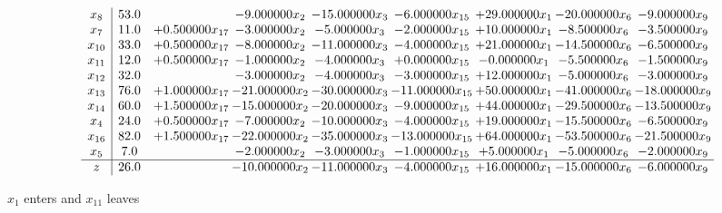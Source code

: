 \documentclass[10pt]{article}
\begin{document}
 \[\begin{array}{c| c c@{\hskip 2pt} c@{\hskip 2pt} c@{\hskip 2pt} c@{\hskip 2pt} c@{\hskip 2pt} c@{\hskip 2pt} c@{\hskip 2pt} }
 x_{8}   &  53.0  &   & -9.000000 x_{2} & -15.000000 x_{3} & -6.000000 x_{15} & + 29.000000 x_{1} & -20.000000 x_{6} & -9.000000 x_{9}\\
 x_{7}   &  11.0 & + 0.500000 x_{17} & -3.000000 x_{2} & -5.000000 x_{3} & -2.000000 x_{15} & + 10.000000 x_{1} & -8.500000 x_{6} & -3.500000 x_{9}\\
 x_{10}   &  33.0 & + 0.500000 x_{17} & -8.000000 x_{2} & -11.000000 x_{3} & -4.000000 x_{15} & + 21.000000 x_{1} & -14.500000 x_{6} & -6.500000 x_{9}\\
 x_{11}   &  12.0 & + 0.500000 x_{17} & -1.000000 x_{2} & -4.000000 x_{3} & + 0.000000 x_{15} & -0.000000 x_{1} & -5.500000 x_{6} & -1.500000 x_{9}\\
 x_{12}   &  32.0  &   & -3.000000 x_{2} & -4.000000 x_{3} & -3.000000 x_{15} & + 12.000000 x_{1} & -5.000000 x_{6} & -3.000000 x_{9}\\
 x_{13}   &  76.0 & + 1.000000 x_{17} & -21.000000 x_{2} & -30.000000 x_{3} & -11.000000 x_{15} & + 50.000000 x_{1} & -41.000000 x_{6} & -18.000000 x_{9}\\
 x_{14}   &  60.0 & + 1.500000 x_{17} & -15.000000 x_{2} & -20.000000 x_{3} & -9.000000 x_{15} & + 44.000000 x_{1} & -29.500000 x_{6} & -13.500000 x_{9}\\
 x_{4}   &  24.0 & + 0.500000 x_{17} & -7.000000 x_{2} & -10.000000 x_{3} & -4.000000 x_{15} & + 19.000000 x_{1} & -15.500000 x_{6} & -6.500000 x_{9}\\
 x_{16}   &  82.0 & + 1.500000 x_{17} & -22.000000 x_{2} & -35.000000 x_{3} & -13.000000 x_{15} & + 64.000000 x_{1} & -53.500000 x_{6} & -21.500000 x_{9}\\
 x_{5}   &  7.0  &   & -2.000000 x_{2} & -3.000000 x_{3} & -1.000000 x_{15} & + 5.000000 x_{1} & -5.000000 x_{6} & -2.000000 x_{9}\\
\hline
z    &  26.0  &   & -10.000000 x_{2} & -11.000000 x_{3} & -4.000000 x_{15} & + 16.000000 x_{1} & -15.000000 x_{6} & -6.000000 x_{9}\\
\end{array}\]


 $ x_{1} $ enters and $ x_{11} $ leaves 
\end{document}

